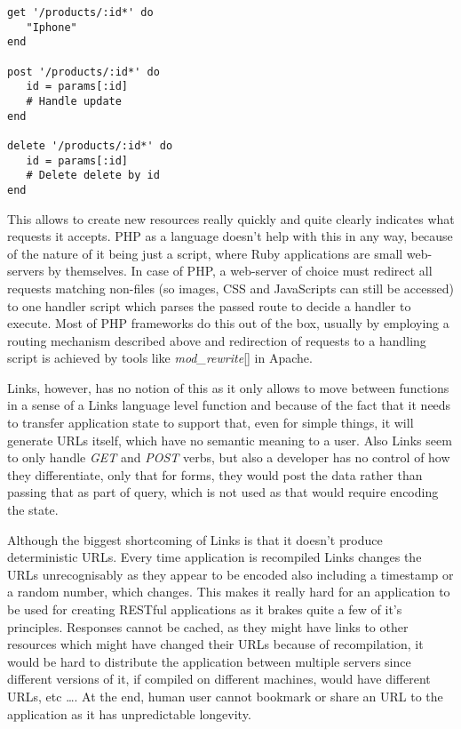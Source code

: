\begin{codelisting}
\begin{verbatim}
get '/products/:id*' do
   "Iphone"
end

post '/products/:id*' do
   id = params[:id]
   # Handle update
end

delete '/products/:id*' do
   id = params[:id]
   # Delete delete by id
end
\end{verbatim}
\end{codelisting}

This allows to create new resources really quickly and quite clearly indicates what requests it accepts. PHP as a language doesn't help with this in any way, because of the nature of it being just a script, where Ruby applications are small web-servers by themselves. In case of PHP, a web-server of choice must redirect all requests matching non-files (so images, CSS and JavaScripts can still be accessed) to one handler script which parses the passed route to decide a handler to execute. Most of PHP frameworks do this out of the box, usually by employing a routing mechanism described above and redirection of requests to a handling script is achieved by tools like \textit{mod\_rewrite}[] in Apache.

Links, however, has no notion of this as it only allows to move between functions in a sense of a Links language level function and because of the fact that it needs to transfer application state to support that, even for simple things, it will generate URLs itself, which have no semantic meaning to a user. Also Links seem to only handle \textit{GET} and \textit{POST} verbs, but also a developer has no control of how they differentiate, only that for forms, they would post the data rather than passing that as part of query, which is not used as that would require encoding the state.

Although the biggest shortcoming of Links is that it doesn't produce deterministic URLs. Every time application is recompiled Links changes the URLs unrecognisably as they appear to be encoded also including a timestamp or a random number, which changes. This makes it really hard for an application to be used for creating RESTful applications as it brakes quite a few of it's principles. Responses cannot be cached, as they might have links to other resources which might have changed their URLs because of recompilation, it would be hard to distribute the application between multiple servers since different versions of it, if compiled on different machines, would have different URLs, etc \ldots. At the end, human user cannot bookmark or share an URL to the application as it has unpredictable longevity. 

